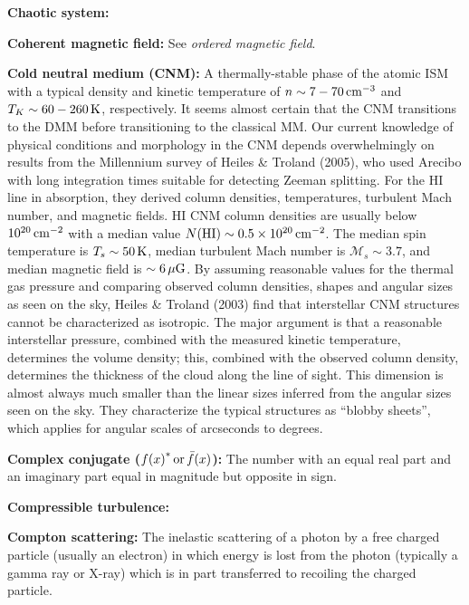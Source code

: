 \documentclass[a4paper,10pt]{article}
\begin{document}
{\noindent}\textbf{Chaotic system:}

{\noindent}\textbf{Coherent magnetic field:} See \textit{ordered magnetic field}.

{\noindent}\textbf{Cold neutral medium (CNM):} A thermally-stable phase of the atomic ISM with a typical density and kinetic temperature of $n\sim7-70\,{\rm cm^{-3}}$ and $T_K\sim60-260\,{\rm K}$, respectively. It seems almost certain that the CNM transitions to the DMM before transitioning to the classical MM. Our current knowledge of physical conditions and morphology in the CNM depends overwhelmingly on results from the Millennium survey of Heiles \& Troland (2005), who used Arecibo with long integration times suitable for detecting Zeeman splitting. For the HI line in absorption, they derived column densities, temperatures, turbulent Mach number, and magnetic fields. HI CNM column densities are usually below $10^{20}\,{\rm cm^{-2}}$ with a median value $N({\rm HI})\sim0.5\times10^{20}\,{\rm cm^{-2}}$. The median spin temperature is $T_s\sim50\,{\rm K}$, median turbulent Mach number is $\mathcal{M}_s\sim3.7$, and median magnetic field is $\sim6\,\mu{\rm G}$. By assuming reasonable values for the thermal gas pressure and comparing observed column densities, shapes and angular sizes as seen on the sky, Heiles \& Troland (2003) find that interstellar CNM structures cannot be characterized as isotropic. The major argument is that a reasonable interstellar pressure, combined with the measured kinetic temperature, determines the volume density; this, combined with the observed column density, determines the thickness of the cloud along the line of sight. This dimension is almost always much smaller than the linear sizes inferred from the angular sizes seen on the sky. They characterize the typical structures as ``blobby sheets'', which applies for angular scales of arcseconds to degrees.

{\noindent}\textbf{Complex conjugate (${f(x)}^*\,{\rm or}\,\bar{f}(x)$):} The number with an equal real part and an imaginary part equal in magnitude but opposite in sign.

{\noindent}\textbf{Compressible turbulence:}

{\noindent}\textbf{Compton scattering:} The inelastic scattering of a photon by a free charged particle (usually an electron) in which energy is lost from the photon (typically a gamma ray or X-ray) which is in part transferred to recoiling the charged particle.
\end{document}

